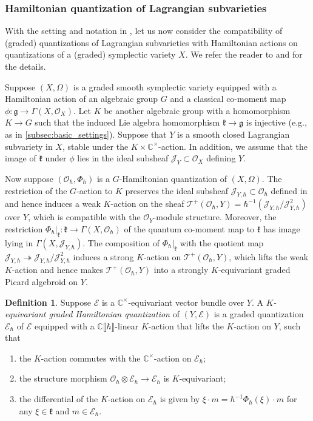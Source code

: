 \documentclass[11pt, a4paper]{amsart}
\newcommand{\C}{\mathbb{C}}
\newcommand{\J}{\mathcal{J}}
\newcommand{\g}{\mathfrak{g}}
\newcommand{\fg}{\mathfrak{g}}
\newcommand{\fk}{\mathfrak{k}}
\newcommand{\cE}{\mathcal{E}}
\newcommand{\hb}{\hbar}
\newcommand{\series}{\llbracket \hb \rrbracket}
\newcommand{\TT}{\mathscr{T}}
\newcommand{\tatp}{\TT^+(\Q, Y)}
\newcommand{\cm}{\C^\times}
\newcommand{\OO}{\mathcal{O}}
\newcommand{\Q}{\OO_\hb}
\theoremstyle{definition}
\newtheorem{defi}[Thm]{Definition}
\numberwithin{equation}{section}
\begin{document}
\subsubsection{Hamiltonian quantization of Lagrangian subvarieties} \label{subsubsec:ham_lag_quant}

With the setting and notation in , let us now consider the compatibility of (graded) quantizations of Lagrangian subvarieties with Hamiltonian actions on quantizations of a (graded) symplectic variety $X$. We refer the reader to \cite[Section 7.3]{LY} and \cite[Section 4.4]{LosevYu} for the details. 

Suppose $(X, \Omega)$ is a graded smooth symplectic variety equipped with a Hamiltonian action of an algebraic group $G$ and a classical co-moment map $\phi: \g \to \Gamma(X, \OO_X)$. Let $K$ be another algebraic group with a homomorphism $K \to G$ such that the induced Lie algebra homomorphism $\fk \to \fg$ is injective (e.g., as in \cref{subsec:basic_settings}). Suppose that $Y$ is a smooth closed Lagrangian subvariety in $X$, stable under the $K \times \cm$-action. In addition, we assume that the image of $\fk$ under $\phi$ lies in the ideal subsheaf $\J_Y \subset \OO_X$ defining $Y$. 

Now suppose $(\OO_\hb,\Phi_\hb)$ is a $G$-Hamiltonian quantization of $(X, \Omega)$. The restriction of the $G$-action to $K$ preserves the ideal subsheaf $\J_{Y,\hb} \subset \OO_\hb$ defined in  and hence induces a weak $K$-action on the sheaf $\tatp=\hb^{-1}(\J_{Y,\hb} / \J_{Y,\hb}^2)$ over $Y$, which is compatible with the $\OO_Y$-module structure. Moreover, the restriction $\Phi_\hb|_{\fk} : \fk \to \Gamma(X, \OO_\hb)$ of the quantum co-moment map to $\fk$ has image lying in $\Gamma(X, \J_{Y,\hb})$. The composition of $\Phi_\hb|_{\fk}$ with the quotient map $\J_{Y,\hb} \twoheadrightarrow \J_{Y,\hb} / \J_{Y,\hb}^2$ induces a strong $K$-action on $\tatp$, which lifts the weak $K$-action and hence makes $\tatp$ into a strongly $K$-equivariant graded Picard algebroid on $Y$.

\begin{defi}\label{defn:equiv_quant_modules}
Suppose $\cE$ is a $\cm$-equivariant vector bundle over $Y$. A {\it $K$-equivariant graded Hamiltonian quantization} of $(Y,\cE)$ is a graded quantization $\cE_\hb$ of $\cE$ equipped with a $\C\series$-linear $K$-action that lifts the $K$-action on $Y$, such that
\begin{enumerate}[label=(\roman*)]
	\item the $K$-action commutes with the $\cm$-action on $\cE_\hb$;
	\item the structure morphism $\OO_\hb \otimes \cE_\hb \to \cE_\hb$ is $K$-equivariant;
	\item the differential of the $K$-action on $\cE_\hb$ is given by
	$\xi \cdot m = \hb^{-1} \Phi_\hb(\xi) \cdot m$
	for any $\xi \in \fk$ and $m \in \cE_\hb$.
\end{enumerate}
\end{defi}
\end{document}
